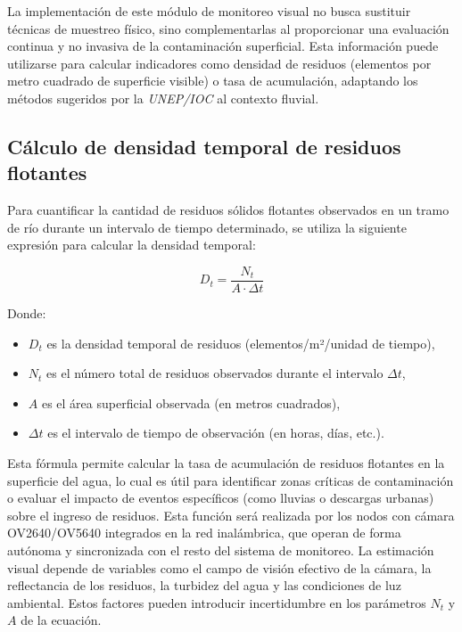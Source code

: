 La implementación de este módulo de monitoreo visual no busca sustituir técnicas de muestreo físico, sino complementarlas al proporcionar una evaluación continua y no invasiva de la contaminación superficial. Esta información puede utilizarse para calcular indicadores como densidad de residuos (elementos por metro cuadrado de superficie visible) o tasa de acumulación, adaptando los métodos sugeridos por la \textit{UNEP/IOC} al contexto fluvial.

\subsection{Cálculo de densidad temporal de residuos flotantes}

Para cuantificar la cantidad de residuos sólidos flotantes observados en un tramo de río durante un intervalo de tiempo determinado, se utiliza la siguiente expresión para calcular la densidad temporal:

\begin{equation}
D_t = \frac{N_t}{A \cdot \Delta t}
\label{eq:densidad_basura_tiempo}
\end{equation}

Donde:
\begin{itemize}
    \item $D_t$ es la densidad temporal de residuos (elementos/m²/unidad de tiempo),
    \item $N_t$ es el número total de residuos observados durante el intervalo $\Delta t$,
    \item $A$ es el área superficial observada (en metros cuadrados),
    \item $\Delta t$ es el intervalo de tiempo de observación (en horas, días, etc.).
\end{itemize}

Esta fórmula permite calcular la tasa de acumulación de residuos flotantes en la superficie del agua, lo cual es útil para identificar zonas críticas de contaminación o evaluar el impacto de eventos específicos (como lluvias o descargas urbanas) sobre el ingreso de residuos. Esta función será realizada por los nodos con cámara OV2640/OV5640 integrados en la red inalámbrica, que operan de forma autónoma y sincronizada con el resto del sistema de monitoreo. La estimación visual depende de variables como el campo de visión efectivo de la cámara, la reflectancia de los residuos, la turbidez del agua y las condiciones de luz ambiental. Estos factores pueden introducir incertidumbre en los parámetros $N_t$ y $A$ de la ecuación.

